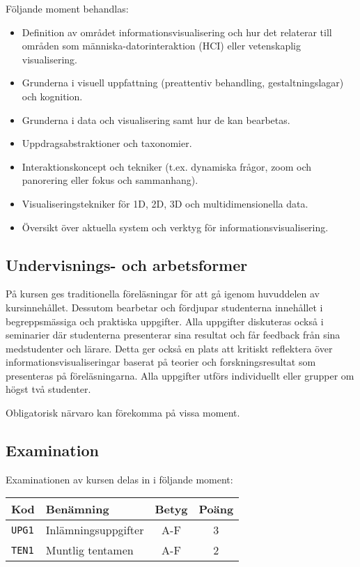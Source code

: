 Följande moment behandlas:

\begin{itemize}
\tightlist
\item
  Definition av området informationsvisualisering och hur det relaterar
  till områden som människa-datorinteraktion (HCI) eller vetenskaplig
  visualisering.
\item
  Grunderna i visuell uppfattning (preattentiv behandling,
  gestaltningslagar) och kognition.
\item
  Grunderna i data och visualisering samt hur de kan bearbetas.
\item
  Uppdragsabstraktioner och taxonomier.
\item
  Interaktionskoncept och tekniker (t.ex. dynamiska frågor, zoom och
  panorering eller fokus och sammanhang).
\item
  Visualiseringstekniker för 1D, 2D, 3D och multidimensionella data.
\item
  Översikt över aktuella system och verktyg för
  informationsvisualisering.
\end{itemize}

\subsection*{Undervisnings- och
arbetsformer}

På kursen ges traditionella föreläsningar för att gå igenom huvuddelen
av kursinnehållet. Dessutom bearbetar och fördjupar studenterna
innehållet i begreppsmässiga och praktiska uppgifter. Alla uppgifter
diskuteras också i seminarier där studenterna presenterar sina resultat
och får feedback från sina medstudenter och lärare. Detta ger också en
plats att kritiskt reflektera över informationsvisualiseringar baserat
på teorier och forskningsresultat som presenteras på föreläsningarna.
Alla uppgifter utförs individuellt eller grupper om högst två studenter.

Obligatorisk närvaro kan förekomma på vissa moment.

\subsection*{Examination}

Examinationen av kursen delas in i följande moment:

\begin{longtable}[]{@{}llcc@{}}
\toprule
\textsf{Kod} & \textsf{Benämning} & \textsf{Betyg} & \textsf{Poäng}\tabularnewline
\midrule
\endhead
\texttt{UPG1} & Inlämningsuppgifter & A-F & 3\tabularnewline
\texttt{TEN1} & Muntlig tentamen & A-F & 2\tabularnewline
\bottomrule
\end{longtable}

